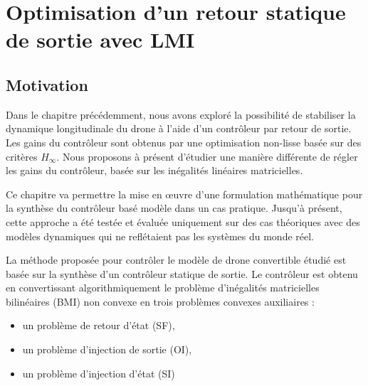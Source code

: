 \chapter{Optimisation d'un retour statique de sortie avec LMI}
\minitoc
\label{chap:LMI}

\section{Motivation}
\label{sec:motivationLMI}

Dans le chapitre précédemment, nous avons exploré la possibilité de stabiliser la dynamique longitudinale du drone à l'aide d'un contrôleur par retour de sortie. Les gains du contrôleur sont obtenus par une optimisation non-lisse basée sur des critères $H_{\infty}$. Nous proposons à présent d'étudier une manière différente de régler les gains du contrôleur, basée sur les inégalités linéaires matricielles.

Ce chapitre va permettre la mise en œuvre d'une formulation mathématique pour la synthèse du contrôleur basé modèle dans un cas pratique. Jusqu'à présent, cette approche a été testée et évaluée uniquement sur des cas théoriques \cite{Arzelier2018} avec des modèles dynamiques qui ne reflétaient pas les systèmes du monde réel. 

La méthode proposée pour contrôler le modèle de drone convertible étudié est basée sur la synthèse d'un contrôleur statique de sortie. Le contrôleur est obtenu en convertissant algorithmiquement le problème d'inégalités matricielles bilinéaires (BMI) non convexe en trois problèmes convexes auxiliaires :
\begin{itemize}
    \item un problème de retour d'état (SF),
    \item un problème d'injection de sortie (OI),
    \item un problème d'injection d'état (SI)
\end{itemize}



